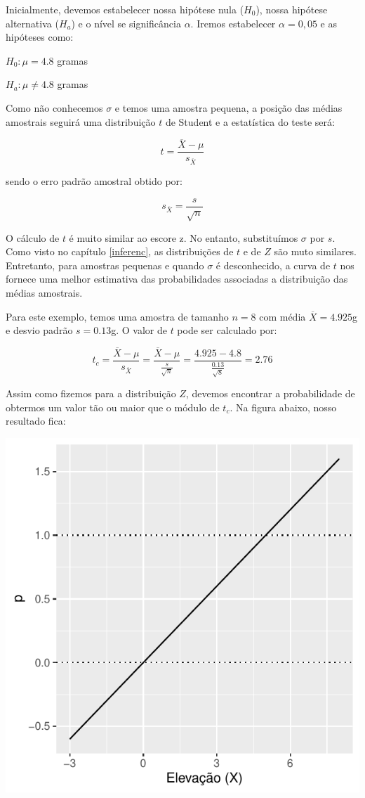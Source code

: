 \documentclass[
]{book}
\begin{document}
Inicialmente, devemos estabelecer nossa hipótese nula (\(H_0\)), nossa hipótese alternativa (\(H_a\)) e o nível se significância \(\alpha\). Iremos estabelecer \(\alpha = 0,05\) e as hipóteses como:

\(H_0: \mu = 4.8\) gramas

\(H_a: \mu \ne 4.8\) gramas

Como não conhecemos \(\sigma\) e temos uma amostra pequena, a posição das médias amostrais seguirá uma distribuição \(t\) de Student e a estatística do teste será:

\[t = \frac{\overline{X} - \mu}{s_{\overline{X}}}\]

sendo o erro padrão amostral obtido por:

\[s_{\overline{X}} = \frac{s}{\sqrt{n}}\]

O cálculo de \(t\) é muito similar ao escore z. No entanto, substituímos \(\sigma\) por \(s\). Como visto no capítulo \ref{inferenc}, as distribuições de \(t\) e de \(Z\) são muto similares. Entretanto, para amostras pequenas e quando \(\sigma\) é desconhecido, a curva de \(t\) nos fornece uma melhor estimativa das probabilidades associadas a distribuição das médias amostrais.

Para este exemplo, temos uma amostra de tamanho \(n = 8\) com média \(\overline{X} = 4.925\)g e desvio padrão \(s = 0.13\)g. O valor de \(t\) pode ser calculado por:

\[t_{c} = \frac{\overline{X} - \mu}{s_{\overline{X}}} = \frac{\overline{X} - \mu}{\frac{s}{\sqrt{n}}} = \frac{4.925  - 4.8}{\frac{0.13}{\sqrt{8}}} = 2.76\]

Assim como fizemos para a distribuição \(Z\), devemos encontrar a probabilidade de obtermos um valor tão ou maior que o módulo de \(t_c\). Na figura abaixo, nosso resultado fica:

\begin{center}\includegraphics{probest-cambientais_files/figure-latex/unnamed-chunk-134-1} \end{center}
\end{document}
